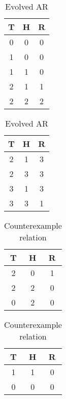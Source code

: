 {\line
\begin{table}[ht]
\begin{minipage}[b]{8cm}
\begin{center}
\begin{tabular}{|c|c|c|} \hline
 T & H & R \\ \hline
 0 & 0 & 0 \\
 1 & 0 & 0 \\
 1 & 1 & 0 \\
 2 & 1 & 1 \\
 2 & 2 & 2 \\  \hline
\end{tabular}
\end{center}
\caption{\label{tab:thr1}Deterministic AR}
\end{minipage}
\hfill
\begin{minipage}[b]{8cm}
\begin{center}
\begin{tabular}{|c|c|c|} \hline
 T & H & R \\ \hline
 2 & 1 & 3 \\
 2 & 3 & 3 \\
 3 & 1 & 3 \\
 3 & 3 & 1 \\  \hline
\end{tabular}
\end{center}
\caption{\label{tab:thr2} Evolved AR}
\end{minipage}
\end{table}
\begin{table}[ht]
\begin{minipage}[b]{8cm}
\begin{center}
\begin{tabular}{|c|c|c|} \hline
 T & H & R \\ \hline
 2 & 0 & 1 \\
 2 & 2 & 0 \\
 0 & 2 & 0 \\ \hline
\end{tabular}
\end{center}
\caption{\label{tab:thr3} Evolved example relation}
\end{minipage}
\hfill
\begin{minipage}[b]{8cm}
\begin{center}
\begin{tabular}{|c|c|c|} \hline
 T & H & R \\ \hline
 1 & 1 & 0 \\
 0 & 0 & 0 \\ \hline
\end{tabular}
\end{center}
\caption{\label{tab:thr4} Counterexample relation}
\end{minipage}
\end{table}
}

